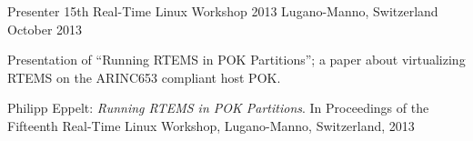 \begin{cventries}
  \cventry
    {Presenter}
    {15th Real-Time Linux Workshop 2013}
    {Lugano-Manno, Switzerland}
    {October 2013}
    {
      \begin{cvitems}
        \item {Presentation of ``Running RTEMS in POK Partitions''; a paper
	  about virtualizing RTEMS on the ARINC653 compliant host POK.}
	\item {Philipp Eppelt: \textit{Running RTEMS in POK Partitions}. In
	  Proceedings of the Fifteenth Real-Time Linux Workshop, Lugano-Manno,
	  Switzerland, 2013}
      \end{cvitems}
    }
\end{cventries}
